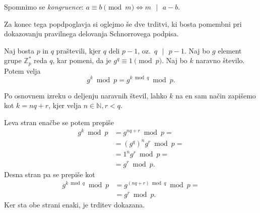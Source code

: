 \documentclass[isrm2, tisk]{fmfdelo}
\newcommand{\N}{\mathbb N}
\newcommand{\Z}{\mathbb Z}
\begin{document}
\begin{opomba}
    Spomnimo se \textit{kongruence}: $a \equiv b \pmod m \iff m \text{ }|\text{ } a - b$.
\end{opomba}

Za konec tega popdpoglavja si oglejmo še dve trditvi, ki bosta pomembni pri dokazovanju pravilnega
delovanja Schnorrovega podpisa.

\begin{trditev}
\label{trd:mod-q}
    Naj bosta $p$ in $q$ praštevili, kjer $q$ deli $p - 1$, oz.\ $q \text{ }|\text{ } p - 1$. Naj
    bo $g$ element grupe $\Z_p^*$ reda $q$, kar pomeni, da je $g^q \equiv 1 \pmod p$. Naj bo $k$
    naravno število. Potem velja 
    $$ 
    g^k \bmod p = g^{k \bmod q} \bmod p.
    $$
\end{trditev}
\begin{dokaz}
    Po osnovnem izreku o deljenju naravnih števil, lahko $k$ na en sam način zapišemo kot $k = nq + r$, 
    kjer velja $n \in \N, r < q$.

    Leva stran enačbe se potem prepiše 
    \begin{align*}
        g^k \bmod p &= g^{nq + r} \bmod p = \\ 
                    &= (g^q)^n g^r \bmod p = \\ 
                    &= 1^n g^r \bmod p = \\ 
                    &= g^r \bmod p.
    \end{align*}
    Desna stran pa se prepiše kot 
    \begin{align*}
        g^{k \bmod q} \bmod p &= g^{(nq + r) \bmod q} \bmod p = \\ 
                              &= g^r \bmod p.
    \end{align*}
    Ker sta obe strani enaki, je trditev dokazana.
\end{dokaz}
\end{document}
